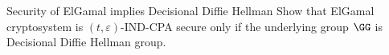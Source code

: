 \documentclass{crypto-exercise}
\author{Sven Laur}
\begin{document}
\begin{exercise}{Security of ElGamal implies Decisional Diffie Hellman}
Show that ElGamal cryptosystem is $(t,\varepsilon)$-IND-CPA secure only if the underlying group $\GG$ is Decisional Diffie Hellman group.
\end{exercise}


\begin{solution}
\end{solution}
\end{document}
